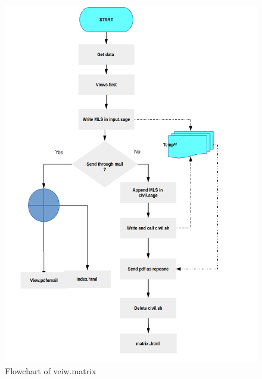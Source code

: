 \begin{figure}[!h]
\centering \includegraphics[scale=0.27]{images/flowchartmatrix.png}
\caption{Flowchart of veiw.matrix}
\end{figure}

